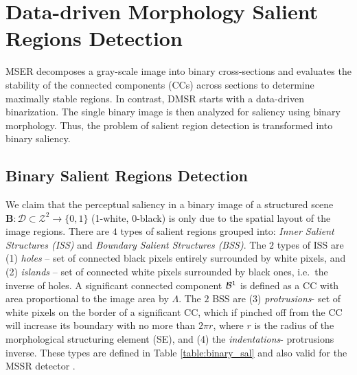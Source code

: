 \documentclass[conference,compsoc]{IEEEtran}
\def\B{{\mathbf B}}
\def\mcD{{\mathcal{D}}}
\begin{document}
\section{Data-driven Morphology Salient Regions Detection}
\label{sec:DMSR}


MSER decomposes a gray-scale image into binary cross-sections and evaluates the stability of the connected components (CCs) across sections to determine maximally stable regions. In contrast, DMSR starts with a data-driven binarization. The single binary image is then analyzed for saliency using binary morphology. Thus, the problem of salient region detection is transformed into binary saliency.

\subsection{Binary Salient Regions Detection}
\label{ssec:binary}
We claim that the perceptual saliency in a binary image of a structured scene 
 $\B: \mcD \subset \mathcal{Z}^2 \rightarrow \{0,1\}$ (1-white, 0-black)
is only due to the spatial layout of the image regions. 
There are $4$ types of salient regions grouped into: {\em Inner Salient Structures (ISS)} and {\em Boundary Salient Structures (BSS)}. The $2$ types of ISS are (1) {\em holes} -- set of connected black pixels entirely surrounded by white pixels, and (2) {\em islands} -- set of connected white pixels surrounded by black ones, i.e.~the inverse of holes. A significant connected component ${\cal B}^1$ is defined as a CC with area proportional to the image area by $\Lambda$.
The $2$ BSS are (3) {\em protrusions}- set of white pixels on the border of a significant CC, which if pinched off from the CC will increase its boundary with no more than $2\pi r$, where $r$ is the radius of the morphological structuring element (SE), and (4) the {\em indentations}- protrusions inverse. 
These types are defined in Table \ref{table:binary_sal} and also valid for the MSSR detector \cite{RangHumpb06}. 
\end{document}
